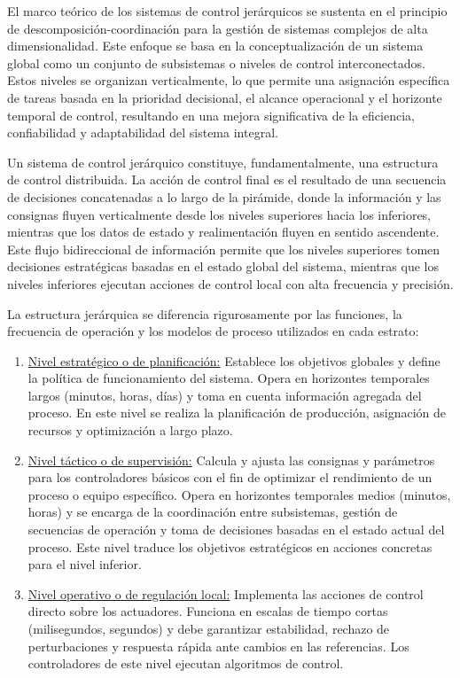El marco teórico de los sistemas de control jerárquicos se sustenta en el principio de descomposición-coordinación para la gestión de sistemas complejos de alta dimensionalidad. Este enfoque se basa en la conceptualización de un sistema global como un conjunto de subsistemas o niveles de control interconectados. Estos niveles se organizan verticalmente, lo que permite una asignación específica de tareas basada en la prioridad decisional, el alcance operacional y el horizonte temporal de control, resultando en una mejora significativa de la eficiencia, confiabilidad y adaptabilidad del sistema integral.

Un sistema de control jerárquico constituye, fundamentalmente, una estructura de control distribuida. La acción de control final es el resultado de una secuencia de decisiones concatenadas a lo largo de la pirámide, donde la información y las consignas fluyen verticalmente desde los niveles superiores hacia los inferiores, mientras que los datos de estado y realimentación fluyen en sentido ascendente. Este flujo bidireccional de información permite que los niveles superiores tomen decisiones estratégicas basadas en el estado global del sistema, mientras que los niveles inferiores ejecutan acciones de control local con alta frecuencia y precisión.

La estructura jerárquica se diferencia rigurosamente por las funciones, la frecuencia de operación y los modelos de proceso utilizados en cada estrato:
\begin{enumerate}

\item \underline{Nivel estratégico o de planificación:} Establece los objetivos globales y define la política de funcionamiento del sistema. Opera en horizontes temporales largos (minutos, horas, días) y toma en cuenta información agregada del proceso. En este nivel se realiza la planificación de producción, asignación de recursos y optimización a largo plazo.

\item \underline{Nivel táctico o de supervisión:} Calcula y ajusta las consignas y parámetros para los controladores básicos con el fin de optimizar el rendimiento de un proceso o equipo específico. Opera en horizontes temporales medios (minutos, horas) y se encarga de la coordinación entre subsistemas, gestión de secuencias de operación y toma de decisiones basadas en el estado actual del proceso. Este nivel traduce los objetivos estratégicos en acciones concretas para el nivel inferior.

\item \underline{Nivel operativo o de regulación local:} Implementa las acciones de control directo sobre los actuadores. Funciona en escalas de tiempo cortas (milisegundos, segundos) y debe garantizar estabilidad, rechazo de perturbaciones y respuesta rápida ante cambios en las referencias. Los controladores de este nivel ejecutan algoritmos de control.

\end{enumerate}

